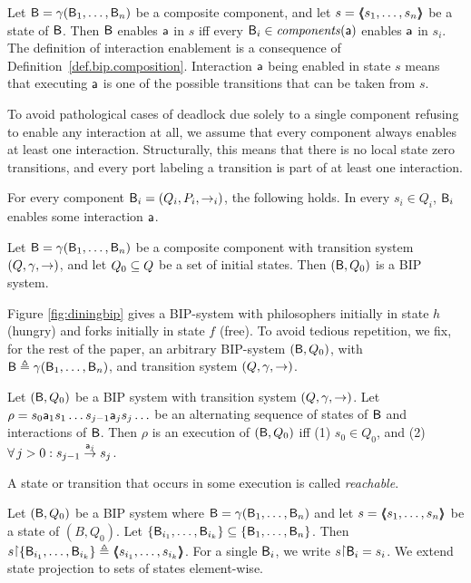 Let $\B = \gamma(\B_1,\dots,\B_n)$ be a composite component, and let $s =
\tpl{s_1,\ldots,s_n}$ be a state of $\B$.  Then $\B$ enables $\act$ in $s$
iff every $\B_i \in \cmps{\act}$ enables $\act$ in $s_i$.  
\ed
%
The definition of  interaction enablement is a consequence of 
Definition~\ref{def.bip.composition}.
Interaction $\act$ being enabled in state $s$ means that executing
$\act$ is one of the possible transitions that can be taken from $s$.

To avoid pathological cases of deadlock due solely to a single component refusing to enable any interaction at all, 
we assume that every component always enables at least one interaction.
Structurally, this means that there is no local state zero transitions, and every port labeling a transition is 
part of at least one interaction. 

 \label{def.bip.local-enablement}
For every component  $\B_i = (Q_i,P_i,\goesto_i)$, the following holds. In every $s_i \in Q_i$, $\B_i$ enables some
interaction $\act$.
\ed

\label{def.bip.system} Let $\B = \gamma(\B_1,\dots,\B_n)$ be a composite component with transition system $(Q,\gamma,
\goestog)$, and let $Q_0 \sub Q$ be a set of initial states. Then $(\B,Q_0)$ is a BIP system.  \ed

\noindent
Figure \ref{fig:diningbip} gives a BIP-system with philosophers initially in state $h$ (hungry) and forks initially in
state $f$ (free).
%
To avoid tedious repetition, we fix, for the rest of the paper, an arbitrary BIP-system $(\B, Q_0)$, with
$\B \df \gamma(\B_1,\dots,\B_n)$, and transition system $(Q,\gamma, \goestog)$.


\bd[Execution]\label{def.bip.execution} Let $(\B, Q_0)$ be a BIP system
with transition system $(Q,\gamma, \goestog)$.  Let $\rho = s_0 \act_1 s_1 \ldots s_{j-1} \act_j s_j \ldots$ be an alternating sequence of
states of $\B$ and interactions of $\B$. Then $\rho$ is an execution of
$(\B, Q_0)$ iff (1) $s_0 \in Q_0$, and (2) $\fa j > 0: s_{j-1} \goesto[\act_j] s_j$.  \ed



\label{def.bip.reachable}
A state or transition that occurs in some execution is called \emph{reachable}.

\ed


\label{def.bip.state.projection} Let $(\B, Q_0)$ be a BIP system where $\B = \gamma(\B_1,\dots,\B_n)$ and let
$s = \tpl{s_1,\dots,s_n}$ be a state of $(B, Q_0)$. Let $\set{\B_{i_1},\dots,\B_{i_k}} \sub \set{\B_1,\dots,\B_n}$. Then
$s \pj \set{\B_{i_1},\dots,\B_{i_k}} \df \tpl{s_{i_1},\dots,s_{i_k}}$. For a single $\B_i$, we write $s \pj \B_i = s_i$.
%
We extend state projection to sets of states element-wise.
\ed


